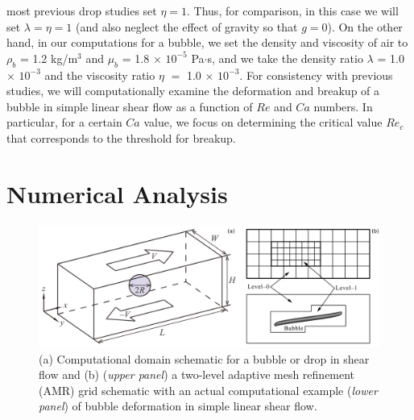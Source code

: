 \documentclass[%
 reprint,
 showkeys,
 amsmath,amssymb,
 aps,
 prfluids,
 onecolumn
]{revtex4-2}
\begin{document}
most previous drop studies set $\eta = 1$. Thus, for comparison, in this case
we will set $\lambda = \eta = 1$ (and also neglect the effect of gravity so
that $g=0$). On the other hand, in our computations for a bubble, we set the
density and viscosity of air to $\rho_{b}$ = 1.2 kg/m$^{3}$ and $\mu_{b}$ = 1.8
$\times$ $10^{-5}$ Pa$\cdot$s, and we take the 
density ratio 
$\lambda$ = 1.0 $\times$ $10^{-3}$ 
and the 
viscosity ratio 
$\eta$ $=$ 1.0 $\times$ $10^{-3}$.
For consistency with previous studies, we will computationally examine the
deformation and breakup of a bubble in simple linear shear flow as a
function of $Re$ and $Ca$ numbers.  In particular, 
for a certain $Ca$ value, we
focus on determining the critical value 
$Re_{c}$ that corresponds to the threshold
for breakup.

\section{Numerical Analysis}
% 
\begin{figure}%
  \centering
  \includegraphics[width=\textwidth]{SchematicAndGrid}
  \caption{(a) Computational domain schematic for a bubble or drop in shear 
           flow and (b) (\textit{upper panel}) a two-level adaptive mesh 
           refinement (AMR) grid schematic with an actual computational 
           example (\textit{lower panel}) of bubble deformation in simple linear 
           shear flow.}
  \label{fig:SchemAndGrid}
\end{figure}
%
\end{document}

